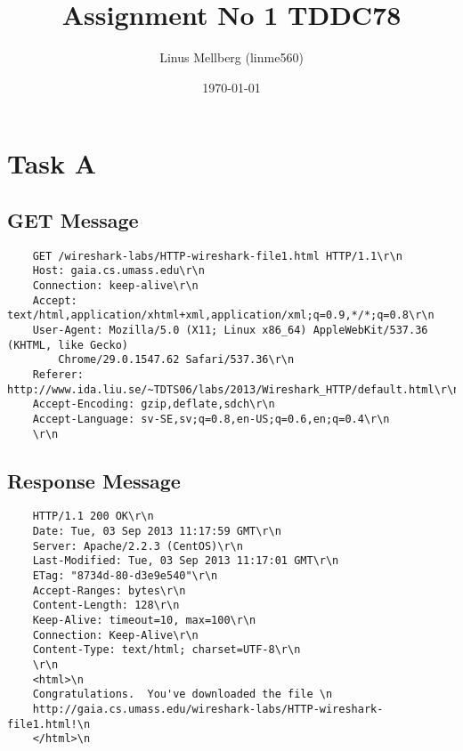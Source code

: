 \documentclass[a4paper,11pt]{article}
\begin{document}
\title{Assignment No 1 TDDC78}
\author{Linus Mellberg (linme560)}
\date{\today}
\maketitle
\pagebreak
\thispagestyle{tcr}
\pagestyle{tcr}

\section{Task A}
\subsection{GET Message}
\begin{verbatim}
    GET /wireshark-labs/HTTP-wireshark-file1.html HTTP/1.1\r\n
    Host: gaia.cs.umass.edu\r\n
    Connection: keep-alive\r\n
    Accept: text/html,application/xhtml+xml,application/xml;q=0.9,*/*;q=0.8\r\n
    User-Agent: Mozilla/5.0 (X11; Linux x86_64) AppleWebKit/537.36 (KHTML, like Gecko)
        Chrome/29.0.1547.62 Safari/537.36\r\n
    Referer: http://www.ida.liu.se/~TDTS06/labs/2013/Wireshark_HTTP/default.html\r\n
    Accept-Encoding: gzip,deflate,sdch\r\n
    Accept-Language: sv-SE,sv;q=0.8,en-US;q=0.6,en;q=0.4\r\n
    \r\n
\end{verbatim}

\subsection{Response Message}
\begin{verbatim}
    HTTP/1.1 200 OK\r\n
    Date: Tue, 03 Sep 2013 11:17:59 GMT\r\n
    Server: Apache/2.2.3 (CentOS)\r\n
    Last-Modified: Tue, 03 Sep 2013 11:17:01 GMT\r\n
    ETag: "8734d-80-d3e9e540"\r\n
    Accept-Ranges: bytes\r\n
    Content-Length: 128\r\n
    Keep-Alive: timeout=10, max=100\r\n
    Connection: Keep-Alive\r\n
    Content-Type: text/html; charset=UTF-8\r\n
    \r\n
    <html>\n
    Congratulations.  You've downloaded the file \n
    http://gaia.cs.umass.edu/wireshark-labs/HTTP-wireshark-file1.html!\n
    </html>\n
\end{verbatim}
\end{document}
